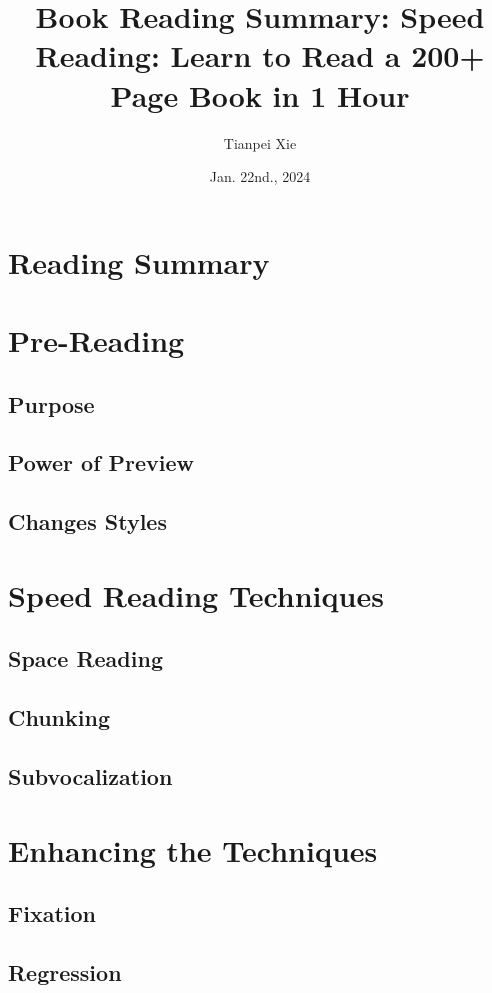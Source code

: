 \documentclass[11pt]{article}
\begin{document}
\title{Book Reading Summary: Speed Reading: Learn to Read a 200+ Page Book in 1 Hour}
\author{ Tianpei Xie}
\date{Jan. 22nd., 2024}
\maketitle
\tableofcontents
\newpage
\section{Reading Summary}

\newpage
\section{Pre-Reading}
\subsection{Purpose}
\subsection{Power of Preview}
\subsection{Changes Styles}

\section{Speed Reading Techniques}
\subsection{Space Reading}
\subsection{Chunking}
\subsection{Subvocalization}


\section{Enhancing the Techniques}
\subsection{Fixation}
\subsection{Regression}
\end{document}
